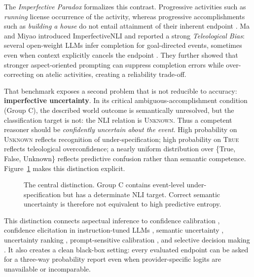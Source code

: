 \documentclass[letterpaper]{article}
\begin{document}
The \emph{Imperfective Paradox} formalizes this contrast. Progressive activities such as \emph{running} license occurrence of the activity, whereas progressive accomplishments such as \emph{building a house} do not entail attainment of their inherent endpoint \citep{vendler-1957-verbs,dowty-1979-word,comrie-1976-aspect}. Ma and Miyao introduced ImperfectiveNLI and reported a strong \emph{Teleological Bias}: several open-weight LLMs infer completion for goal-directed events, sometimes even when context explicitly cancels the endpoint \citep{ma-miyao-2026-imperfective}. They further showed that stronger aspect-oriented prompting can suppress completion errors while over-correcting on atelic activities, creating a reliability trade-off.

That benchmark exposes a second problem that is not reducible to accuracy: \textbf{imperfective uncertainty}. In its critical ambiguous-accomplishment condition (Group C), the described world outcome is semantically unresolved, but the classification target is not: the NLI relation is \textsc{Unknown}. Thus a competent reasoner should be \emph{confidently uncertain about the event}. High probability on \textsc{Unknown} reflects recognition of under-specification; high probability on \textsc{True} reflects teleological overconfidence; a nearly uniform distribution over \{True, False, Unknown\} reflects predictive confusion rather than semantic competence. Figure~\ref{fig:concept} makes this distinction explicit.

\begin{figure}[t]
\centering
\resizebox{\columnwidth}{!}{}
\caption{The central distinction. Group C contains event-level under-specification but has a determinate NLI target. Correct semantic uncertainty is therefore not equivalent to high predictive entropy.}
\label{fig:concept}
\end{figure}

This distinction connects aspectual inference to confidence calibration \citep{guo-etal-2017-calibration,desai-durrett-2020-calibration,jiang-etal-2021-calibration}, confidence elicitation in instruction-tuned LLMs \citep{tian-etal-2023-calibration,xiong-etal-2024-uncertainty}, semantic uncertainty \citep{farquhar-etal-2024-semantic}, uncertainty ranking \citep{huang-etal-2024-rankcalibration}, prompt-sensitive calibration \citep{cox-etal-2025-mapping}, and selective decision making \citep{cole-etal-2023-ambiguous,geifman-el-yaniv-2019-selectivenet,wang-etal-2025-sconu}. It also creates a clean black-box setting: every evaluated endpoint can be asked for a three-way probability report even when provider-specific logits are unavailable or incomparable.
\end{document}
